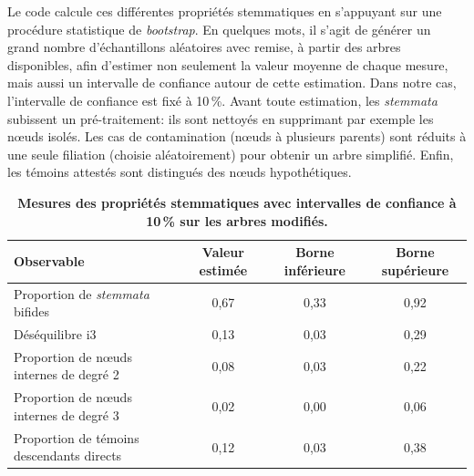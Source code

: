 \documentclass[a4paper,twoside,12pt]{book}
\begin{document}
Le code calcule ces différentes propriétés stemmatiques en s'appuyant sur une procédure statistique de \textit{bootstrap}. En quelques mots, il s'agit de générer un grand nombre d’échantillons aléatoires avec remise, à partir des arbres disponibles, afin d’estimer non seulement la valeur moyenne de chaque mesure, mais aussi un intervalle de confiance autour de cette estimation. Dans notre cas, l’intervalle de confiance est fixé à 10 \%. Avant toute estimation, les \textit{stemmata} subissent un pré-traitement: ils sont nettoyés en supprimant par exemple les nœuds isolés. Les cas de contamination (nœuds à plusieurs parents) sont réduits à une seule filiation (choisie aléatoirement) pour obtenir un arbre simplifié. Enfin, les témoins attestés sont distingués des nœuds hypothétiques.

\begin{table}[H]
	\centering
	\begin{tabular}{lccc}
		\toprule
		\textbf{Observable} & \textbf{Valeur estimée} & \textbf{Borne inférieure} & \textbf{Borne supérieure} \\
		\midrule
		Proportion de \textit{stemmata} bifides          & 0{,}67 & 0{,}33 & 0{,}92 \\
		Déséquilibre i3                                     & 0{,}13 & 0{,}03 & 0{,}29 \\
		Proportion de nœuds internes de degré 2          & 0{,}08 & 0{,}03 & 0{,}22 \\
		Proportion de nœuds internes de degré 3          & 0{,}02 & 0{,}00 & 0{,}06 \\
		Proportion de témoins descendants directs        & 0{,}12 & 0{,}03 & 0{,}38 \\
		\bottomrule
	\end{tabular}
	\caption{\textbf{Mesures des propriétés stemmatiques avec intervalles de confiance à 10\,\% sur les arbres modifiés.}}
	\label{tab:stemmatic_metrics}
\end{table}
\end{document}

